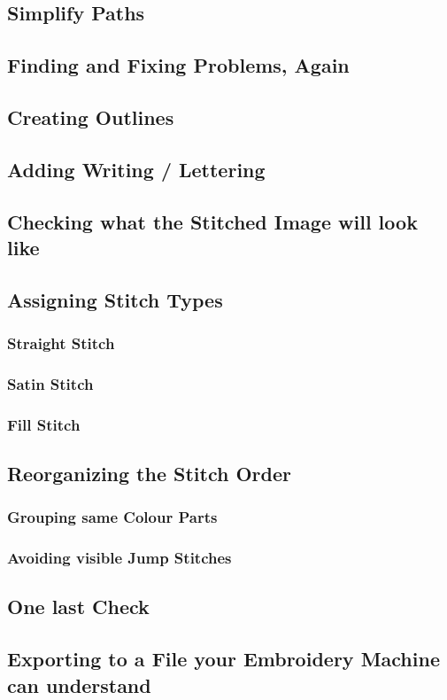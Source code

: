\documentclass{article}
\begin{document}
        \subsection{Simplify Paths}

        \subsection{Finding and Fixing Problems, Again}

        \subsection{Creating Outlines}

        \subsection{Adding Writing / Lettering}

        \subsection{Checking what the Stitched Image will look like}

        \subsection{Assigning Stitch Types}

            \subsubsection{Straight Stitch}

            \subsubsection{Satin Stitch}

            \subsubsection{Fill Stitch}

        \subsection{Reorganizing the Stitch Order}

            \subsubsection{Grouping same Colour Parts}

            \subsubsection{Avoiding visible Jump Stitches}

        \subsection{One last Check}

        \subsection{Exporting to a File your Embroidery Machine can understand}
\end{document}
